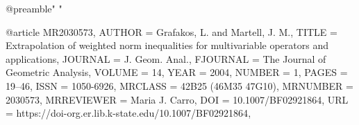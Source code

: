 @preamble{"\def\ocirc#1{\ifmmode\setbox0=\hbox{$#1$}\dimen0=\ht0     \advance\dimen0 by1pt\rlap{\hbox to\wd0{\hss\raise\dimen0     \hbox{\hskip.2em$\scriptscriptstyle\circ$}\hss}}#1\else     {\accent"17 #1}\fi} "}


@article {MR2030573,
    AUTHOR = {Grafakos, L. and Martell, J. M.},
     TITLE = {Extrapolation of weighted norm inequalities for multivariable
              operators and applications},
   JOURNAL = {J. Geom. Anal.},
  FJOURNAL = {The Journal of Geometric Analysis},
    VOLUME = {14},
      YEAR = {2004},
    NUMBER = {1},
     PAGES = {19--46},
      ISSN = {1050-6926},
   MRCLASS = {42B25 (46M35 47G10)},
  MRNUMBER = {2030573},
MRREVIEWER = {Maria J. Carro},
       DOI = {10.1007/BF02921864},
       URL = {https://doi-org.er.lib.k-state.edu/10.1007/BF02921864},
}
